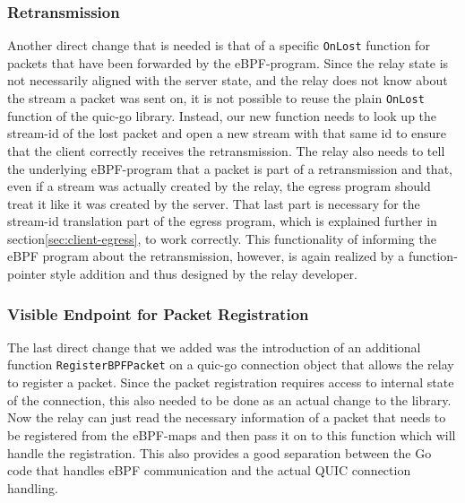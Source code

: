 \subsubsection*{Retransmission}
Another direct change that is needed is that of a specific \verb|OnLost| function for packets that 
have been forwarded by the eBPF-program.
Since the relay state is not necessarily aligned with the server state, and the relay does not know
about the stream a packet was sent on, it is not possible to reuse the plain \verb|OnLost| function
of the quic-go library.
Instead, our new function needs to look up the stream-id of the lost packet and open a new stream with
that same id to ensure that the client correctly receives the retransmission.
The relay also needs to tell the underlying eBPF-program that a packet is part of a retransmission and 
that, even if a stream was actually created by the relay, the egress program should treat it like it was
created by the server.
That last part is necessary for the stream-id translation part of the egress program, which is explained further
in section\nobreakspace\ref{sec:client-egress}, to work correctly.
This functionality of informing the eBPF program about the retransmission, however, is again realized by a 
function-pointer style addition and thus designed by the relay developer.

\subsubsection*{Visible Endpoint for Packet Registration}
The last direct change that we added was the introduction of an additional function \verb|RegisterBPFPacket| 
on a quic-go connection object that allows the relay to register a packet.
Since the packet registration requires access to internal state of the connection, this also needed to be 
done as an actual change to the library.
Now the relay can just read the necessary information of a packet that needs to be registered
from the eBPF-maps and then pass it on to this function which will handle the registration.
This also provides a good separation between the Go code that handles eBPF communication and the actual
QUIC connection handling.
